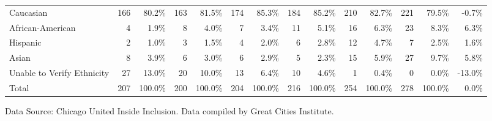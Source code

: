 \documentclass[
]{article}
\begin{document}
\begin{landscape}
\begin{table}[H]
\begin{threeparttable}
\begin{tabular}[t]{>{\raggedright\arraybackslash}p{10em}>{}r>{}r>{}r>{}r>{}r>{}r>{}r>{}r>{}r>{}r>{}r>{}r>{}r}
\midrule
Caucasian & 166 & 80.2\% & 163 & 81.5\% & 174 & 85.3\% & 184 & 85.2\% & 210 & 82.7\% & 221 & 79.5\% & -0.7\%\\
African-American & 4 & 1.9\% & 8 & 4.0\% & 7 & 3.4\% & 11 & 5.1\% & 16 & 6.3\% & 23 & 8.3\% & 6.3\%\\
Hispanic & 2 & 1.0\% & 3 & 1.5\% & 4 & 2.0\% & 6 & 2.8\% & 12 & 4.7\% & 7 & 2.5\% & 1.6\%\\
Asian & 8 & 3.9\% & 6 & 3.0\% & 6 & 2.9\% & 5 & 2.3\% & 15 & 5.9\% & 27 & 9.7\% & 5.8\%\\
Unable to Verify Ethnicity & 27 & 13.0\% & 20 & 10.0\% & 13 & 6.4\% & 10 & 4.6\% & 1 & 0.4\% & 0 & 0.0\% & -13.0\%\\
Total & 207 & 100.0\% & 200 & 100.0\% & 204 & 100.0\% & 216 & 100.0\% & 254 & 100.0\% & 278 & 100.0\% & 0.0\%\\
\bottomrule
\end{tabular}
\begin{tablenotes}
\small
\item [] \footnotesize{Data Source: Chicago United Inside Inclusion. Data compiled by Great Cities Institute.}
\end{tablenotes}
\end{threeparttable}
\end{table}

\end{landscape}
\end{document}
